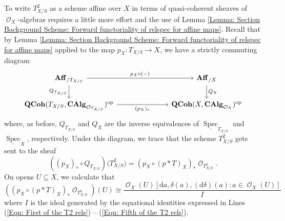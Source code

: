 \documentclass{amsart}
\theoremstyle{definition}
\DeclareMathOperator{\Ocal}{\mathcal{O}}
\DeclareMathOperator{\op}{op}
\DeclareMathOperator{\Spec}{Spec}
\newcommand{\CAlg}[1]{\mathbf{CAlg}_{#1}}
\newcommand{\RelSpec}[1]{\underline{\Spec}_{#1}}
\DeclareMathOperator{\QCoh}{\mathbf{QCoh}}
\numberwithin{equation}{subsection}
\begin{document}
To write $T_{X/S}^2$ as a scheme affine over $X$ in terms of quasi-coherent sheaves of $\Ocal_X$-algebras requires a little more effort and the use of Lemma \ref{Lemma: Section Background Scheme: Forward functoriality of relspec for affine maps}. Recall that by Lemma \ref{Lemma: Section Background Scheme: Forward functoriality of relspec for affine maps} applied to the map $p_X:T_{X/S} \to X$, we have a strictly commuting diagram
\[
\begin{tikzcd}
\mathbf{Aff}_{/T_{X/S}} \ar[rrr]{}{p_{X} \circ (-)} \ar[d, swap]{}{Q_{T_{X/S}}} & & & \mathbf{Aff}_{/X} \ar[d]{}{Q_X} \\
\QCoh(T_{X/S},\CAlg{\Ocal_{T_{X/S}}})^{\op} \ar[rrr, swap]{}{(p_X)_{\ast}} & & & \QCoh(X,\CAlg{\Ocal_X})^{\op}
\end{tikzcd}
\]
where, as before, $Q_{T_{X/S}}$ and $Q_{X}$ are the inverse equivalences of $\RelSpec{T_{X/S}}$ and $\RelSpec{X}$, respectively. Under this diagram, we trace that the scheme $T^2_{X/S}$ gets sent to the sheaf
\[
\left((p_X)_{\ast} \circ Q_{T_{X/S}}\right)\big(T_{X/S}^{2}\big) = \left(p_X \circ \left(p \ast T\right)_{X}\right)_{\ast}\Ocal_{T_{X/S}^{2}}.
\]
On opens $U \subseteq X$, we calculate that
\[
\left(\left(p_X \circ \left(p \ast T\right)_{X}\right)_{\ast}\Ocal_{T_{X/S}^{2}}\right)(U) \cong \frac{\Ocal_X(U)[\mathrm{d}a, \delta(a), (\mathrm{d}\delta)(a):a \in \Ocal_X(U)]}{I}
\]
where $I$ is the ideal generated by the equational identities expressed in Lines (\ref{Eqn: First of the T2 rels})  -- (\ref{Eqn: Fifth of the T2 rels}).
\end{document}
